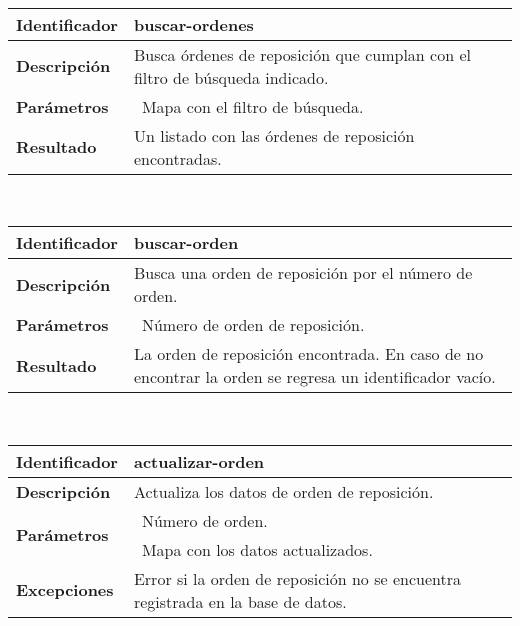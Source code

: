 	\vspace{5mm}\\
	\begin{tabular}{|p{}|p{}|}
		\hline
		\textbf{Identificador}	& \textbf{buscar-ordenes}\\
		\hline
		\hline
		\textbf{Descripción}	& Busca órdenes de reposición que cumplan con el filtro de búsqueda indicado.\\
		\hline
		\textbf{Parámetros}		& \textbullet\, Mapa con el filtro de búsqueda.\\
		\hline
		\textbf{Resultado}		& Un listado con las órdenes de reposición encontradas.\\
		\hline
	\end{tabular}
	\vspace{5mm}\\
	\begin{tabular}{|p{}|p{}|}
		\hline
		\textbf{Identificador}	& \textbf{buscar-orden}\\
		\hline
		\hline
		\textbf{Descripción}	& Busca una orden de reposición por el número de orden.\\
		\hline
		\textbf{Parámetros}		& \textbullet\, Número de orden de reposición.\\
		\hline
		\textbf{Resultado}		& La orden de reposición encontrada. En caso de no encontrar la orden se regresa un identificador vacío.\\
		\hline
	\end{tabular}
	\vspace{5mm}\\
	\begin{tabular}{|p{}|p{}|}
		\hline
		\textbf{Identificador}	& \textbf{actualizar-orden}\\
		\hline
		\hline
		\textbf{Descripción}	& Actualiza los datos de orden de reposición.\\
		\hline
		\multirow{2}{*}{\textbf{Parámetros}}	& \textbullet\, Número de orden.\\
												& \textbullet\, Mapa con los datos actualizados.\\
		\hline
		\textbf{Excepciones}	& Error si la orden de reposición no se encuentra registrada en la base de datos.\\
		\hline
	\end{tabular}
	\vspace{5mm}

